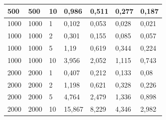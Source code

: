 \documentclass[a4paper,10pt]{article}
\begin{document}
\begin{table}[h]
\begin{tabular}{|l|l|l|l|l|l|l|}
500                 & 500                  & 10         & 0,986                & 0,511                & 0,277                & 0,187                \\ \hline
1000                & 1000                 & 1          & 0,102                & 0,053                & 0,028                & 0,021                \\ \hline
1000                & 1000                 & 2          & 0,301                & 0,155                & 0,085                & 0,057                \\ \hline
1000                & 1000                 & 5          & 1,19                 & 0,619                & 0,344                & 0,224                \\ \hline
1000                & 1000                 & 10         & 3,956                & 2,052                & 1,115                & 0,743                \\ \hline
2000                & 2000                 & 1          & 0,407                & 0,212                & 0,133                & 0,08                 \\ \hline
2000                & 2000                 & 2          & 1,198                & 0,621                & 0,328                & 0,226                \\ \hline
2000                & 2000                 & 5          & 4,764                & 2,479                & 1,336                & 0,898                \\ \hline
2000                & 2000                 & 10         & 15,867               & 8,229                & 4,346                & 2,982                \\ \hline
\end{tabular}
\end{table}
\end{document}
